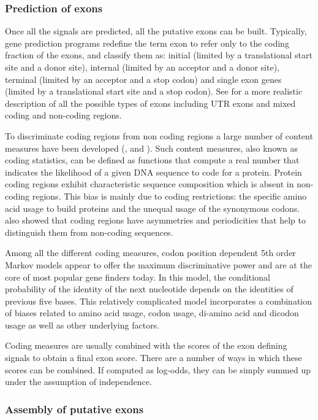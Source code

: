\subsubsection{Prediction of exons}

Once all the signals are predicted, all the putative exons can be
built. Typically, gene prediction programs redefine the term exon to
refer only to the coding fraction of the exons, and classify them
as: initial (limited by a translational start site and a donor site),
internal (limited by an acceptor and a donor site), terminal (limited
by an acceptor and a stop codon) and single exon genes (limited by a
translational start site and a stop codon). See
\cite{zhang:2002a} for a more realistic description of all the
possible types of exons including UTR exons and mixed coding and
non-coding regions.

To discriminate coding regions from non coding regions a large number
of content measures have been developed (\cite{fickett:1992a},
\cite{gelfand:1995a} and \cite{guigo:1999a}). Such content measures, 
also known as coding statistics, can be defined as functions that
compute a real number that indicates the likelihood of a given DNA
sequence to code for a protein. Protein coding regions exhibit
characteristic sequence composition which is absent in non-coding
regions. This bias is mainly due to coding restrictions: the specific
amino acid usage to build proteins and the unequal usage of the
synonymous codons.  \cite{fickett:1982a} also showed that coding
regions have asymmetries and periodicities that help to distinguish
them from non-coding sequences.

Among all the different coding measures, codon position dependent 5th
order Markov models \citep{borodovsky:1993a} appear to offer the
maximum discriminative power \citep{guigo:1998a} and are at the core
of most popular gene finders today. In this model, the conditional
probability of the identity of the next nucleotide depends on the
identities of previous five bases. This relatively complicated model
incorporates a combination of biases related to amino acid usage, codon
usage, di-amino acid and dicodon usage as well as other underlying
factors.

Coding measures are usually combined with the scores of the exon
defining signals to obtain a final exon score. There are a number of
ways in which these scores can be combined. If computed as log-odds,
they can be simply summed up under the assumption of independence.


\subsubsection{Assembly of putative exons}

